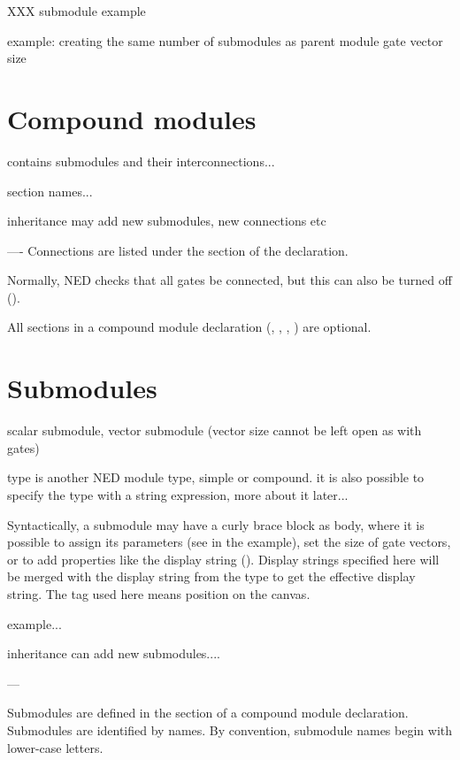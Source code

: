 XXX submodule example

example: creating the same number of submodules as parent module gate vector size



\section{Compound modules}

contains submodules and their interconnections...

section names...

inheritance may add new submodules, new connections etc

----
Connections are listed under the  section of the
declaration.

Normally, NED checks that all gates be connected, but this can also
be turned off ().

All sections in a compound module declaration (,
, , ) are optional.



\section{Submodules}

scalar submodule, vector submodule (vector size cannot be left open as with gates)

type is another NED module type, simple or compound. it is also possible
to specify the type with a string expression, more about it later...

Syntactically, a submodule may have a curly brace block as body, where
it is possible to assign its parameters (see  in the example),
set the size of gate vectors, or to add properties like the display string
(). Display strings specified here will be merged with the
display string from the type to get the effective display string.
The  tag used here means position on the canvas.

example...

inheritance can add new submodules....

---

Submodules are defined in the
 section of a compound
module declaration. Submodules are identified by names.
By convention, submodule names begin with lower-case letters.


